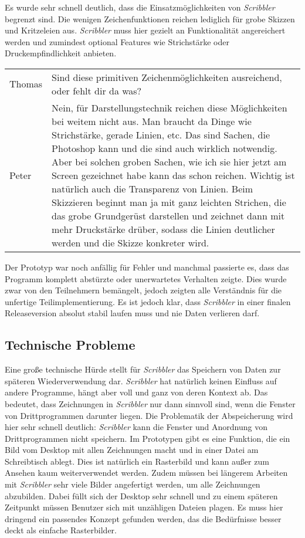 \medskip Es wurde sehr schnell deutlich, dass die Einsatzmöglichkeiten von \emph{Scribbler} begrenzt sind. Die wenigen Zeichenfunktionen reichen lediglich für grobe Skizzen und Kritzeleien aus. \emph{Scribbler} muss hier gezielt an Funktionalität angereichert werden und zumindest optional Features wie Strichstärke oder Druckempfindlichkeit anbieten.

\begin{extract}[Die Einsatzmöglichkeiten sind begrenzt.]
	{
		\myfloatalign
		\begin{tabularx}{\textwidth}{p{1cm}X}
			Thomas & Sind diese primitiven Zeichenmöglichkeiten ausreichend, oder fehlt dir da was?\\
			Peter & Nein, für Darstellungstechnik reichen diese Möglichkeiten bei weitem nicht aus. Man braucht da Dinge wie Strichstärke, gerade Linien, etc. Das sind Sachen, die Photoshop kann und die sind auch wirklich notwendig. Aber bei solchen groben Sachen, wie ich sie hier jetzt am Screen gezeichnet habe kann das schon reichen. Wichtig ist natürlich auch die Transparenz von Linien. Beim Skizzieren beginnt man ja mit ganz leichten Strichen, die das grobe Grundgerüst darstellen und zeichnet dann mit mehr Druckstärke drüber, sodass die Linien deutlicher werden und die Skizze konkreter wird.
		\end{tabularx}
	}
\end{extract}

Der Prototyp war noch anfällig für Fehler und manchmal passierte es, dass das Programm komplett abstürzte oder unerwartetes Verhalten zeigte. Dies wurde zwar von den Teilnehmern bemängelt, jedoch zeigten alle Verständnis für die unfertige Teilimplementierung. Es ist jedoch klar, dass \emph{Scribbler} in einer finalen Releaseversion absolut stabil laufen muss und nie Daten verlieren darf.


\subsection{Technische Probleme}
Eine große technische Hürde stellt für \emph{Scribbler} das Speichern von Daten zur späteren Wiederverwendung dar. \emph{Scribbler} hat natürlich keinen Einfluss auf andere Programme, hängt aber voll und ganz von deren Kontext ab. Das bedeutet, dass Zeichnungen in \emph{Scribbler} nur dann sinnvoll sind, wenn die Fenster von Drittprogrammen darunter liegen. Die Problematik der Abspeicherung wird hier sehr schnell deutlich: \emph{Scribbler} kann die Fenster und Anordnung von Drittprogrammen nicht speichern. Im Prototypen gibt es eine Funktion, die ein Bild vom Desktop mit allen Zeichnungen macht und in einer Datei am Schreibtisch ablegt. Dies ist natürlich ein Rasterbild und kann außer zum Ansehen kaum weiterverwendet werden. Zudem müssen bei längerem Arbeiten mit \emph{Scribbler} sehr viele Bilder angefertigt werden, um alle Zeichnungen abzubilden. Dabei füllt sich der Desktop sehr schnell und zu einem späteren Zeitpunkt müssen Benutzer sich mit unzähligen Dateien plagen. Es muss hier dringend ein passendes Konzept gefunden werden, das die Bedürfnisse besser deckt als einfache Rasterbilder. 

